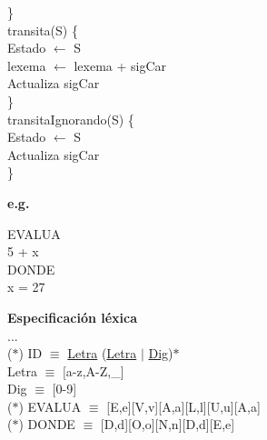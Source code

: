 \documentclass[\main/Apuntes_PL.tex]{subfiles}
\begin{document}
      \hspace{5mm}\}\\
      \vspace{10mm}
      \hspace{5mm}transita(S) \{\\
      \hspace{10mm}Estado $\leftarrow$ S\\
      \hspace{10mm}lexema $\leftarrow$ lexema + sigCar\\
      \hspace{10mm}Actualiza sigCar\\
      \hspace{5mm}\}\\
      \vspace{10mm}
      \hspace{5mm}transitaIgnorando(S) \{\\
      \hspace{10mm}Estado $\leftarrow$ S\\
      \hspace{10mm}Actualiza sigCar\\
      \hspace{5mm}\}

      \newpage
      \par \noindent
      \textbf{e.g.}
      \begin{center}
        \begin{minipage}{.2 \textwidth}
          EVALUA\\
          5 + x\\
          DONDE\\
          x = 27
        \end{minipage}%
        \begin{minipage}{.5 \textwidth}
          \par \noindent
          \textbf{Especificación léxica}\\
          \vspace{2mm}
          \hspace{5mm}...\\
          \hspace{5mm}($\ast$) ID $\equiv$ \underline{Letra} (\underline{Letra} $\mid$ \underline{Dig})$\ast$\\
          \hspace{11mm}Letra $\equiv$ $[$a-z,A-Z,\_]\\
          \hspace{11mm}Dig $\equiv$ $[$0-9]\\
          \hspace{5mm}($\ast$) EVALUA $\equiv$ [E,e][V,v][A,a][L,l][U,u][A,a]\\
          \hspace{5mm}($\ast$) DONDE $\equiv$ [D,d][O,o][N,n][D,d][E,e]\\
        \end{minipage}
      \end{center}
\end{document}
